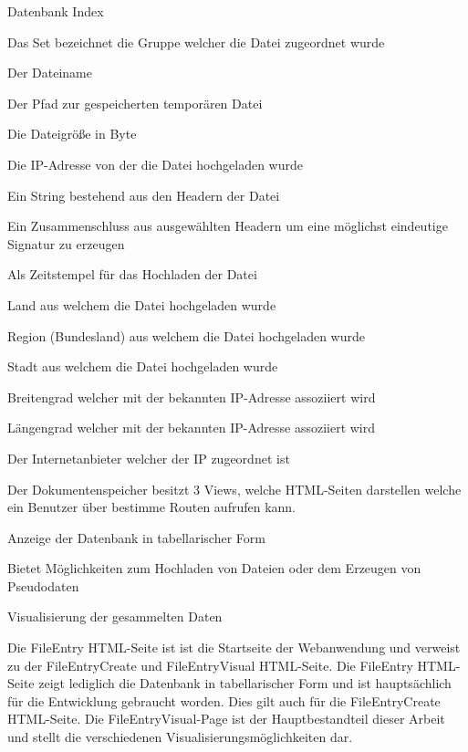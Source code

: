 \documentclass[
    fontsize=12pt,
    headings=small,
    parskip=half,           %
    bibliography=totoc,
    numbers=noenddot,       %
    open=any,               %
    ]{scrreprt}
\begin{document}
\begin{description}[style=nextline]
\item[ID] Datenbank Index
\item[Set] Das Set bezeichnet die Gruppe welcher die Datei zugeordnet wurde
\item[Filename] Der Dateiname
\item[Filepath] Der Pfad zur gespeicherten temporären Datei
\item[Size] Die Dateigröße in Byte
\item[IPAddress] Die IP-Adresse von der die Datei hochgeladen wurde
\item[Headers] Ein String bestehend aus den Headern der Datei
\item[HeaderFingerprint] Ein Zusammenschluss aus ausgewählten Headern um eine möglichst eindeutige Signatur zu erzeugen
\item[DateTime] Als Zeitstempel für das Hochladen der Datei
\item[Country] Land aus welchem die Datei hochgeladen wurde
\item[RegionName] Region (Bundesland) aus welchem die Datei hochgeladen wurde
\item[City] Stadt aus welchem die Datei hochgeladen wurde
\item[Lat] Breitengrad welcher mit der bekannten IP-Adresse assoziiert wird
\item[Lon] Längengrad welcher mit der bekannten IP-Adresse assoziiert wird
\item[Isp] Der Internetanbieter welcher der IP zugeordnet ist
\end{description}

Der Dokumentenspeicher besitzt 3 Views, welche HTML-Seiten darstellen welche ein Benutzer über bestimme Routen aufrufen kann. 

\begin{description}[style=nextline] 
\item[/FileEntry] Anzeige der Datenbank in tabellarischer Form
\item[/FileEntryCreate] Bietet Möglichkeiten zum Hochladen von Dateien oder dem Erzeugen von Pseudodaten
\item[/FileEntryVisual] Visualisierung der gesammelten Daten
\end{description}

Die FileEntry HTML-Seite ist ist die Startseite der Webanwendung und verweist zu der FileEntryCreate und FileEntryVisual HTML-Seite.
Die FileEntry HTML-Seite zeigt lediglich die Datenbank in tabellarischer Form und ist hauptsächlich für die Entwicklung gebraucht worden. 
Dies gilt auch für die FileEntryCreate HTML-Seite. 
Die FileEntryVisual-Page ist der Hauptbestandteil dieser Arbeit und stellt die verschiedenen Visualisierungsmöglichkeiten dar.
\end{document}

